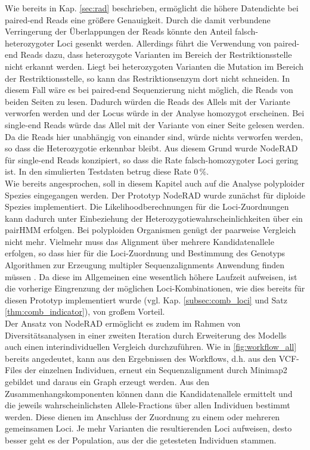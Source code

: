 Wie bereits in Kap. \ref{sec:rad} beschrieben, ermöglicht die höhere Datendichte bei paired-end Reads eine größere Genauigkeit. Durch die damit verbundene Verringerung der Überlappungen der Reads könnte den Anteil falsch-heterozygoter Loci gesenkt werden. Allerdings führt die Verwendung von paired-end Reads dazu, dass heterozygote Varianten im Bereich der Restriktionsstelle nicht erkannt werden. Liegt bei heterozygoten Varianten die Mutation im Bereich der Restriktionsstelle, so kann das Restriktionsenzym dort nicht schneiden. In diesem Fall wäre es bei paired-end Sequenzierung nicht möglich, die Reads von beiden Seiten zu lesen. Dadurch würden die Reads des Allels mit der Variante verworfen werden und der Locus würde in der Analyse homozygot erscheinen. Bei single-end Reads würde das Allel mit der Variante von einer Seite gelesen werden. Da die Reads hier unabhängig von einander sind, würde nichts verworfen werden, so dass die Heterozygotie erkennbar bleibt. Aus diesem Grund wurde NodeRAD für single-end Reads konzipiert, so dass die Rate falsch-homozygoter Loci gering ist. In den simulierten Testdaten betrug diese Rate $0 \, \%$. \\

Wie bereits angesprochen, soll in diesem Kapitel auch auf die Analyse polyploider Spezies eingegangen werden. Der Prototyp NodeRAD wurde zunächst für diploide Spezies implementiert. Die Likelihoodberechnungen für die Loci-Zuordnungen kann dadurch unter Einbeziehung der Heterozygotiewahrscheinlichkeiten über ein pairHMM erfolgen. Bei polyploiden Organismen genügt der paarweise Vergleich nicht mehr. Vielmehr muss das Alignment über mehrere Kandidatenallele erfolgen, so dass hier für die Loci-Zuordnung und Bestimmung des Genotyps Algorithmen zur Erzeugung multipler Sequenzalignments Anwendung finden müssen \cite{chowdhury_2017,bawono_2017,chatzou_2015}. Da diese im Allgemeinen eine wesentlich höhere Laufzeit aufweisen, ist die vorherige Eingrenzung der möglichen Loci-Kombinationen, wie dies bereits für diesen Prototyp implementiert wurde (vgl. Kap. \ref{subsec:comb_loci} und Satz \ref{thm:comb_indicator}), von großem Vorteil. \\

Der Ansatz von NodeRAD ermöglicht es zudem im Rahmen von Diversitätsanalysen in einer zweiten Iteration durch Erweiterung des Modells auch einen interindividuellen Vergleich durchzuführen. Wie in \autoref{fig:workflow_all} bereits angedeutet, kann aus den Ergebnissen des Workflows, d.h. aus den VCF-Files der einzelnen Individuen, erneut ein Sequenzalignment durch Minimap2 gebildet und daraus ein Graph erzeugt werden. Aus den Zusammenhangskomponenten können dann die Kandidatenallele ermittelt und die jeweils wahrscheinlichsten Allele-Fractions über allen Individuen bestimmt werden. Diese dienen im Anschluss der Zuordnung zu einem oder mehreren gemeinsamen Loci. Je mehr Varianten die resultierenden Loci aufweisen, desto besser geht es der Population, aus der die getesteten Individuen stammen.\\

\let\cleardoublepage\clearpage
